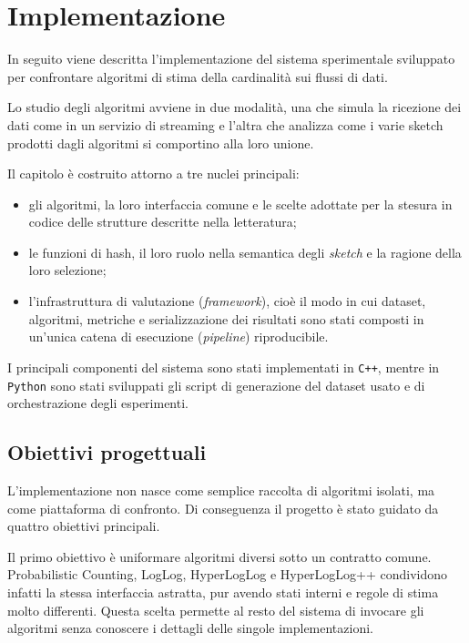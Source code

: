 \chapter{Implementazione}
\label{chp:implementazione_nuovo}

In seguito viene descritta l'implementazione del sistema sperimentale sviluppato
per confrontare algoritmi di stima della cardinalità sui flussi di dati.

Lo studio degli algoritmi avviene in due modalità, una che simula la ricezione dei dati come 
in un servizio di streaming e l'altra che analizza come i varie sketch prodotti dagli algoritmi
si comportino alla loro unione.

Il capitolo è costruito
attorno a tre nuclei principali:
\begin{itemize}
    \item gli algoritmi, la loro interfaccia comune e le scelte adottate per
    la stesura in codice delle strutture descritte nella letteratura;
    \item le funzioni di hash, il loro ruolo nella semantica degli \emph{sketch} e la
    ragione della loro selezione;
    \item l'infrastruttura di valutazione (\emph{framework}), cioè il modo in
    cui dataset, algoritmi,
    metriche e serializzazione dei risultati sono stati composti in un'unica
    catena di esecuzione (\emph{pipeline}) riproducibile.
\end{itemize}

I principali componenti del sistema sono stati implementati in \texttt{C++}, mentre in \texttt{Python}
sono stati sviluppati gli script di generazione del dataset usato e di orchestrazione degli esperimenti.

\section{Obiettivi progettuali}

L'implementazione non nasce come semplice raccolta di algoritmi isolati, ma
come piattaforma di confronto. Di conseguenza il progetto è stato guidato da
quattro obiettivi principali.

Il primo obiettivo è uniformare algoritmi diversi sotto un contratto comune.
Probabilistic Counting, LogLog, HyperLogLog e HyperLogLog++ condividono infatti
la stessa interfaccia astratta, pur avendo stati interni e regole di stima
molto differenti. Questa scelta permette al resto del sistema di invocare gli
algoritmi senza conoscere i dettagli delle singole implementazioni.

